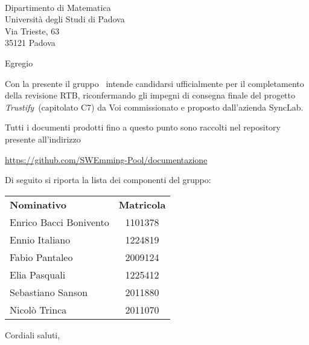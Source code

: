 \documentclass[12pt, boldsubject, italicsignature, noindent]{letteracdp}
\date{}
\renewcommand{\capName}{\textit{Trustify}} %
\renewcommand{\capCode}{C7} %
\renewcommand{\capProposer}{SyncLab} %
\begin{document}
\begin{letter}{
    \Vardanega \\
    Dipartimento di Matematica \\
    Università degli Studi di Padova \\
    Via Trieste, 63 \\ 35121 Padova
}

\opening{Egregio \vardanega}

Con la presente il gruppo \groupName\ intende candidarsi ufficialmente per il completamento della revisione RTB, riconfermando gli impegni di consegna finale del progetto \capName\ (capitolato \capCode) da Voi commissionato e proposto dall'azienda \capProposer.

Tutti i documenti prodotti fino a questo punto sono raccolti nel repository presente all'indirizzo 
\begin{center}
    \url{https://github.com/SWEmming-Pool/documentazione}
\end{center}

Di seguito si riporta la lista dei componenti del gruppo:

\begin{center}
    \begin{tabular}{l|c}
    \textbf{Nominativo} & \textbf{Matricola} \\
    Enrico Bacci Bonivento & 1101378 \\
	Ennio Italiano & 1224819 \\
	Fabio Pantaleo & 2009124 \\     
	Elia Pasquali & 1225412 \\	     
	Sebastiano Sanson & 2011880 \\
    Nicolò Trinca & 2011070
   \end{tabular}
\end{center}

\closing{Cordiali saluti,}

\end{letter}
\end{document}
